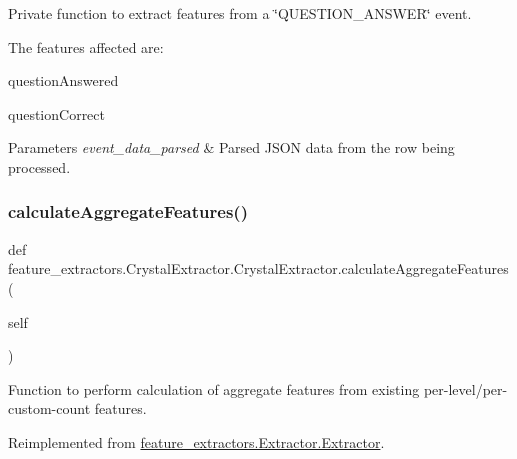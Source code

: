 Private function to extract features from a \char`\"{}\+Q\+U\+E\+S\+T\+I\+O\+N\+\_\+\+A\+N\+S\+W\+E\+R\char`\"{} event. 

The features affected are\+:
\begin{DoxyItemize}
\item question\+Answered
\item question\+Correct
\end{DoxyItemize}


\begin{DoxyParams}{Parameters}
{\em event\+\_\+data\+\_\+parsed} & Parsed J\+S\+ON data from the row being processed. \\
\hline
\end{DoxyParams}
\mbox{\label{classfeature__extractors_1_1_crystal_extractor_1_1_crystal_extractor_ac0aa2a8037f8e7575788a8ac88836538}} 
\subsubsection{\texorpdfstring{calculateAggregateFeatures()}{calculateAggregateFeatures()}}
{\footnotesize\ttfamily def feature\+\_\+extractors.\+Crystal\+Extractor.\+Crystal\+Extractor.\+calculate\+Aggregate\+Features (\begin{DoxyParamCaption}\item[{}]{self }\end{DoxyParamCaption})}



Function to perform calculation of aggregate features from existing per-\/level/per-\/custom-\/count features. 



Reimplemented from \mbox{\hyperlink{classfeature__extractors_1_1_extractor_1_1_extractor_a7622c0b66dd98f59a8010c3511f4bdad}{feature\+\_\+extractors.\+Extractor.\+Extractor}}.

\mbox{\label{classfeature__extractors_1_1_crystal_extractor_1_1_crystal_extractor_a916b4ecdb7842673f8f62d61732d5624}} 
